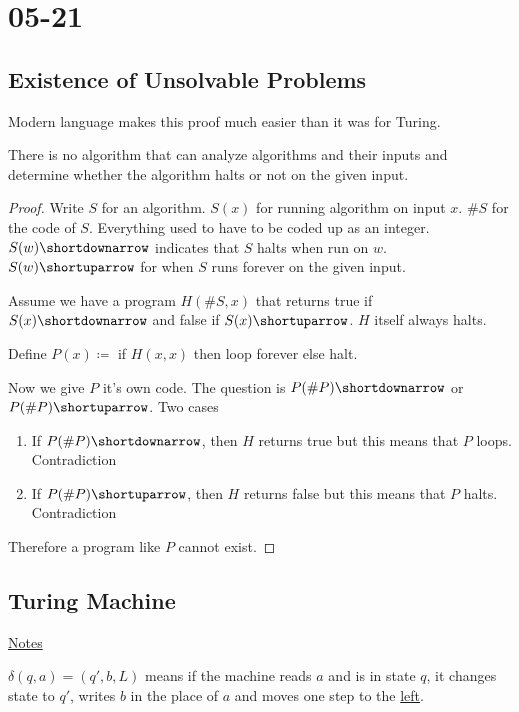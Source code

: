 \documentclass[../598comp.tex]{subfiles}
\date{05-21}
\begin{document}
\section{05-21}

\subsection{Existence of Unsolvable Problems}

Modern language makes this proof much easier than it was for Turing.
\begin{theorem}
  There is no algorithm that can analyze algorithms and their inputs and
  determine whether the algorithm halts or not on the given input.
  \begin{proof}
    Write $S$ for an algorithm. $S(x)$ for running algorithm on input $x$. $\#S$
    for the code of $S$. Everything used to have to be coded up as an integer.
    $S(w) \shortdownarrow$ indicates that $S$ halts when run on $w$. $S(w)
    \shortuparrow$ for when $S$ runs forever on the given input.

    Assume we have a program $H(\#S, x)$ that returns true if $S(x)
    \shortdownarrow$ and false if $S(x) \shortuparrow $. $H$ itself always halts.

    Define $P(x) \coloneqq$ if $H(x, x)$ then loop forever else halt.

    Now we give $P$ it's own code. The question is $P(\#P) \shortdownarrow$ or
    $P(\#P) \shortuparrow$. Two cases
    \begin{enumerate}
    \item 
      If $P(\#P) \shortdownarrow$, then $H$ returns true but this means that $P$
      loops. Contradiction
    \item
      If $P(\#P) \shortuparrow$, then $H$ returns false but this means that $P$
      halts. Contradiction
    \end{enumerate}
    Therefore a program like $P$ cannot exist. 
  \end{proof}
\end{theorem}

\subsection{Turing Machine}

\href{https://cs.mcgill.ca/~prakash/Courses/598/Notes/turing_machines.pdf}{Notes}

$\delta(q, a) = (q', b, L)$ means if the machine reads $a$ and is in state $q$,
it changes state to $q'$, writes $b$ in the place of $a$ and moves one step to
the \ul{left}.
\end{document}
